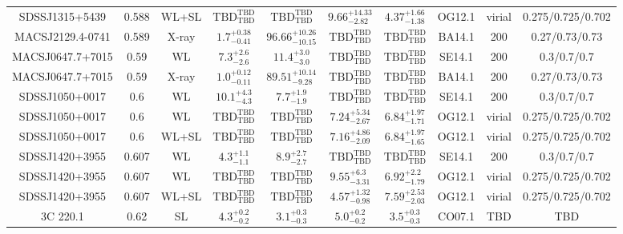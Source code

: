 \begin{table}
\begin{tabular}{cccccccccc}
SDSSJ1315+5439 & 0.588 & WL+SL & ${\mathrm{TBD}}^{\mathrm{TBD}}_{\mathrm{TBD}}$ & ${\mathrm{TBD}}^{\mathrm{TBD}}_{\mathrm{TBD}}$ & ${9.66}^{+14.33}_{-2.82}$ & ${4.37}^{+1.66}_{-1.38}$ & OG12.1 & virial & 0.275/0.725/0.702 \\
MACSJ2129.4-0741 & 0.589 & X-ray & ${1.7}^{+0.38}_{-0.41}$ & ${96.66}^{+10.26}_{-10.15}$ & ${\mathrm{TBD}}^{\mathrm{TBD}}_{\mathrm{TBD}}$ & ${\mathrm{TBD}}^{\mathrm{TBD}}_{\mathrm{TBD}}$ & BA14.1 & 200 & 0.27/0.73/0.73 \\
MACSJ0647.7+7015 & 0.59 & WL & ${7.3}^{+2.6}_{-2.6}$ & ${11.4}^{+3.0}_{-3.0}$ & ${\mathrm{TBD}}^{\mathrm{TBD}}_{\mathrm{TBD}}$ & ${\mathrm{TBD}}^{\mathrm{TBD}}_{\mathrm{TBD}}$ & SE14.1 & 200 & 0.3/0.7/0.7 \\
MACSJ0647.7+7015 & 0.59 & X-ray & ${1.0}^{+0.12}_{-0.11}$ & ${89.51}^{+10.14}_{-9.28}$ & ${\mathrm{TBD}}^{\mathrm{TBD}}_{\mathrm{TBD}}$ & ${\mathrm{TBD}}^{\mathrm{TBD}}_{\mathrm{TBD}}$ & BA14.1 & 200 & 0.27/0.73/0.73 \\
SDSSJ1050+0017 & 0.6 & WL & ${10.1}^{+4.3}_{-4.3}$ & ${7.7}^{+1.9}_{-1.9}$ & ${\mathrm{TBD}}^{\mathrm{TBD}}_{\mathrm{TBD}}$ & ${\mathrm{TBD}}^{\mathrm{TBD}}_{\mathrm{TBD}}$ & SE14.1 & 200 & 0.3/0.7/0.7 \\
SDSSJ1050+0017 & 0.6 & WL & ${\mathrm{TBD}}^{\mathrm{TBD}}_{\mathrm{TBD}}$ & ${\mathrm{TBD}}^{\mathrm{TBD}}_{\mathrm{TBD}}$ & ${7.24}^{+5.34}_{-2.67}$ & ${6.84}^{+1.97}_{-1.71}$ & OG12.1 & virial & 0.275/0.725/0.702 \\
SDSSJ1050+0017 & 0.6 & WL+SL & ${\mathrm{TBD}}^{\mathrm{TBD}}_{\mathrm{TBD}}$ & ${\mathrm{TBD}}^{\mathrm{TBD}}_{\mathrm{TBD}}$ & ${7.16}^{+4.86}_{-2.09}$ & ${6.84}^{+1.97}_{-1.65}$ & OG12.1 & virial & 0.275/0.725/0.702 \\
SDSSJ1420+3955 & 0.607 & WL & ${4.3}^{+1.1}_{-1.1}$ & ${8.9}^{+2.7}_{-2.7}$ & ${\mathrm{TBD}}^{\mathrm{TBD}}_{\mathrm{TBD}}$ & ${\mathrm{TBD}}^{\mathrm{TBD}}_{\mathrm{TBD}}$ & SE14.1 & 200 & 0.3/0.7/0.7 \\
SDSSJ1420+3955 & 0.607 & WL & ${\mathrm{TBD}}^{\mathrm{TBD}}_{\mathrm{TBD}}$ & ${\mathrm{TBD}}^{\mathrm{TBD}}_{\mathrm{TBD}}$ & ${9.55}^{+6.3}_{-3.31}$ & ${6.92}^{+2.2}_{-1.79}$ & OG12.1 & virial & 0.275/0.725/0.702 \\
SDSSJ1420+3955 & 0.607 & WL+SL & ${\mathrm{TBD}}^{\mathrm{TBD}}_{\mathrm{TBD}}$ & ${\mathrm{TBD}}^{\mathrm{TBD}}_{\mathrm{TBD}}$ & ${4.57}^{+1.32}_{-0.98}$ & ${7.59}^{+2.53}_{-2.03}$ & OG12.1 & virial & 0.275/0.725/0.702 \\
3C 220.1 & 0.62 & SL & ${4.3}^{+0.2}_{-0.2}$ & ${3.1}^{+0.3}_{-0.3}$ & ${5.0}^{+0.2}_{-0.2}$ & ${3.5}^{+0.3}_{-0.3}$ & CO07.1 & TBD & TBD \\

\end{tabular}
\end{table}
